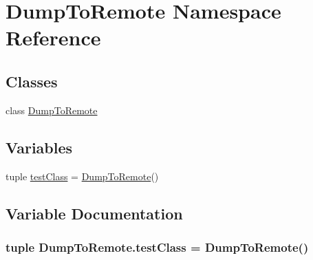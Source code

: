 \hypertarget{namespace_dump_to_remote}{\section{Dump\-To\-Remote Namespace Reference}
\label{namespace_dump_to_remote}
}
\subsection*{Classes}
\begin{DoxyCompactItemize}
\item 
class \hyperlink{class_dump_to_remote_1_1_dump_to_remote}{Dump\-To\-Remote}
\end{DoxyCompactItemize}
\subsection*{Variables}
\begin{DoxyCompactItemize}
\item 
tuple \hyperlink{namespace_dump_to_remote_acf0b6919aa67c6d95dbf0c665a6651c4}{test\-Class} = \hyperlink{class_dump_to_remote_1_1_dump_to_remote}{Dump\-To\-Remote}()
\end{DoxyCompactItemize}


\subsection{Variable Documentation}
\hypertarget{namespace_dump_to_remote_acf0b6919aa67c6d95dbf0c665a6651c4}{
\subsubsection[{test\-Class}]{\setlength{\rightskip}{0pt plus 5cm}tuple {\bf Dump\-To\-Remote.\-test\-Class} = {\bf Dump\-To\-Remote}()}}\label{namespace_dump_to_remote_acf0b6919aa67c6d95dbf0c665a6651c4}
